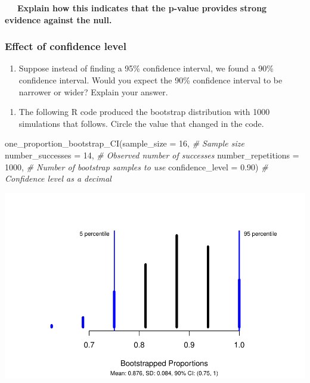 \documentclass[
]{report}
\newenvironment{Shaded}{\begin{snugshade}}{\end{snugshade}}
\newcommand{\AttributeTok}[1]{\textcolor[rgb]{0.77,0.63,0.00}{#1}}
\newcommand{\CommentTok}[1]{\textcolor[rgb]{0.56,0.35,0.01}{\textit{#1}}}
\newcommand{\DecValTok}[1]{\textcolor[rgb]{0.00,0.00,0.81}{#1}}
\newcommand{\FloatTok}[1]{\textcolor[rgb]{0.00,0.00,0.81}{#1}}
\newcommand{\FunctionTok}[1]{\textcolor[rgb]{0.00,0.00,0.00}{#1}}
\newcommand{\NormalTok}[1]{#1}
\providecommand{\tightlist}{%
  \setlength{\itemsep}{0pt}\setlength{\parskip}{0pt}}
\begin{document}
\vspace{.2in}

~~~\textbf{Explain how this indicates that the p-value provides strong evidence against the null.}

\newpage

\hypertarget{effect-of-confidence-level}{%
\subsubsection*{Effect of confidence level}\label{effect-of-confidence-level}}

\begin{enumerate}
\def\labelenumi{\arabic{enumi}.}
\setcounter{enumi}{11}
\tightlist
\item
  Suppose instead of finding a 95\% confidence interval, we found a 90\% confidence interval. Would you expect the 90\% confidence interval to be narrower or wider? Explain your answer.
\end{enumerate}

\vspace{0.4in}

\begin{enumerate}
\def\labelenumi{\arabic{enumi}.}
\setcounter{enumi}{12}
\tightlist
\item
  The following R code produced the bootstrap distribution with 1000 simulations that follows. Circle the value that changed in the code.
\end{enumerate}

\begin{Shaded}
\begin{Highlighting}[]
\FunctionTok{one\_proportion\_bootstrap\_CI}\NormalTok{(}\AttributeTok{sample\_size =} \DecValTok{16}\NormalTok{, }\CommentTok{\# Sample size}
                    \AttributeTok{number\_successes =} \DecValTok{14}\NormalTok{, }\CommentTok{\# Observed number of successes}
                    \AttributeTok{number\_repetitions =} \DecValTok{1000}\NormalTok{, }\CommentTok{\# Number of bootstrap samples to use}
                    \AttributeTok{confidence\_level =} \FloatTok{0.90}\NormalTok{) }\CommentTok{\# Confidence level as a decimal}
\end{Highlighting}
\end{Shaded}

\begin{center}\includegraphics[width=0.7\linewidth]{06-L04-inference-1cat_CI-simulation_files/figure-latex/unnamed-chunk-2-1} \end{center}
\end{document}
